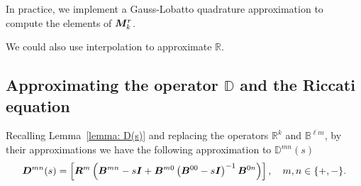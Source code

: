 In practice, we implement a Gauss-Lobatto quadrature approximation to compute the elements of \(\boldsymbol M_k^r\).

\begin{rem}
	We could also use interpolation to approximate \(\mathbb R\). 
\end{rem}

\subsection{Approximating the operator \(\mathbb D\) and the Riccati equation}
Recalling Lemma~\ref{lemma: D(s)} and replacing the operators \(\mathbb R^k\) and \(\mathbb B^{\ell m}\), by their approximations we have the following approximation to \(\mathbb D^{mn}(s)\)
\begin{align*}
		 {\boldsymbol D}^{mn}(s) = \left[ \boldsymbol {R}^{m}\left(
		{ {\boldsymbol B}}^{mn} - s{\boldsymbol I} + { {\boldsymbol B}}^{m0 }\left({ {\boldsymbol B}}^{00}- s\boldsymbol I \right)^{-1} { {\boldsymbol B}}^{0n}\right)\right],\quad m,n \in\{+,-\}.
\end{align*} 

